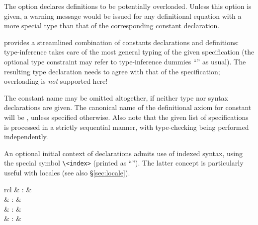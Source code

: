 \begin{isabellebody}
\begin{isamarkuptext}
\begin{descr}
  The  option declares definitions to be
  potentially overloaded.  Unless this option is given, a warning
  message would be issued for any definitional equation with a more
  special type than that of the corresponding constant declaration.
  
  \item [\hyperlink{command.constdefs}{\mbox{\isa{\isacommand{constdefs}}}}] provides a streamlined combination of
  constants declarations and definitions: type-inference takes care of
  the most general typing of the given specification (the optional
  type constraint may refer to type-inference dummies ``\isa{{\isacharunderscore}}'' as usual).  The resulting type declaration needs to agree with
  that of the specification; overloading is \emph{not} supported here!
  
  The constant name may be omitted altogether, if neither type nor
  syntax declarations are given.  The canonical name of the
  definitional axiom for constant  will be ,
  unless specified otherwise.  Also note that the given list of
  specifications is processed in a strictly sequential manner, with
  type-checking being performed independently.
  
  An optional initial context of  declarations
  admits use of indexed syntax, using the special symbol \verb|\<index>| (printed as ``\isa{{\isachardoublequote}{\isasymindex}{\isachardoublequote}}'').  The latter concept is
  particularly useful with locales (see also \S\ref{sec:locale}).

  \end{descr}%
\end{isamarkuptext}%
\isamarkuptrue%
%
\isamarkuptrue%
%
\begin{isamarkuptext}%
\begin{matharray}{rcl}
    \hypertarget{command.syntax}{\hyperlink{command.syntax}{\mbox{}}} & : &  \\
    \hypertarget{command.no-syntax}{\hyperlink{command.no-syntax}{\mbox{}}} & : &  \\
    \hypertarget{command.translations}{\hyperlink{command.translations}{\mbox{}}} & : &  \\
    \hypertarget{command.no-translations}{\hyperlink{command.no-translations}{\mbox{}}} & : &  \\
  \end{matharray}


\end{isamarkuptext}
\end{isabellebody}
